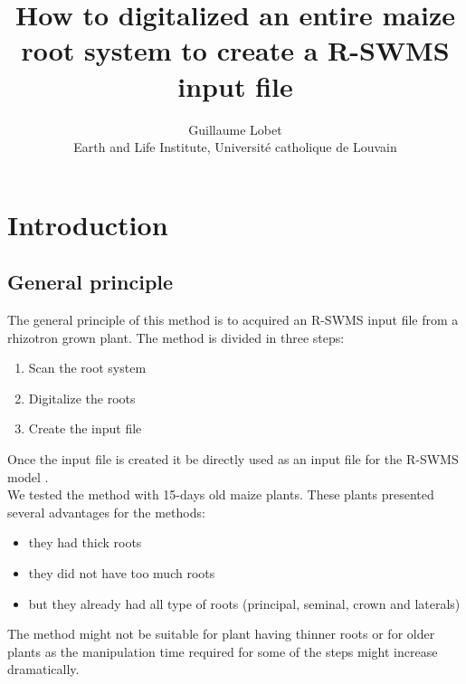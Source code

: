 \documentclass[a4paper,english,10pt]{report}
\begin{document}
\title{How to digitalized an entire maize root system to create a R-SWMS input file}
\author{Guillaume Lobet\\ \small{Earth and Life Institute, Université catholique de Louvain}}

\maketitle
\tableofcontents

\chapter{Introduction}

\section{General principle}

The general principle of this method is to acquired an R-SWMS input file from a rhizotron grown plant.
The method is divided in three steps:

\begin{enumerate}
\item Scan the root system
\item Digitalize the roots
\item Create the input file
\end{enumerate}

Once the input file is created it be directly used as an input file for the R-SWMS model \cite{Javaux08}.\\

We tested the method with 15-days old maize plants. These plants presented several advantages for the methods:

\begin{itemize}
\item they had thick roots
\item they did not have too much roots
\item but they already had all type of roots (principal, seminal, crown and laterals)
\end{itemize}

The method might not be suitable for plant having thinner roots or for older plants as the manipulation time required for some of the steps might increase dramatically.
%
\end{document}
